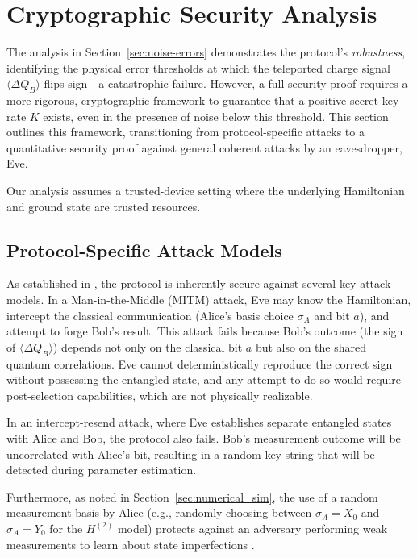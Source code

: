 \section{Cryptographic Security Analysis}
\label{sec:security_analysis}

The analysis in Section~\ref{sec:noise-errors} demonstrates the protocol's \textit{robustness}, identifying the physical error thresholds at which the teleported charge signal $\langle \Delta Q_B \rangle$ flips sign---a catastrophic failure. However, a full security proof requires a more rigorous, cryptographic framework to guarantee that a positive secret key rate $K$ exists, even in the presence of noise below this threshold. This section outlines this framework, transitioning from protocol-specific attacks to a quantitative security proof against general coherent attacks by an eavesdropper, Eve.

Our analysis assumes a trusted-device setting where the underlying Hamiltonian and ground state are trusted resources.

\subsection{Protocol-Specific Attack Models}
\label{sec:attack_models}

As established in \cite{QKDbyQET}, the protocol is inherently secure against several key attack models. In a Man-in-the-Middle (MITM) attack, Eve may know the Hamiltonian, intercept the classical communication (Alice's basis choice $\sigma_A$ and bit $a$), and attempt to forge Bob's result. This attack fails because Bob's outcome (the sign of $\langle \Delta Q_B \rangle$) depends not only on the classical bit $a$ but also on the shared quantum correlations. Eve cannot deterministically reproduce the correct sign without possessing the entangled state, and any attempt to do so would require post-selection capabilities, which are not physically realizable.

In an intercept-resend attack, where Eve establishes separate entangled states with Alice and Bob, the protocol also fails. Bob's measurement outcome will be uncorrelated with Alice's bit, resulting in a random key string that will be detected during parameter estimation.

Furthermore, as noted in Section~\ref{sec:numerical_sim}, the use of a random measurement basis by Alice (e.g., randomly choosing between $\sigma_A = X_0$ and $\sigma_A = Y_0$ for the $H^{(2)}$ model) protects against an adversary performing weak measurements to learn about state imperfections \cite{QKDbyQET}.

